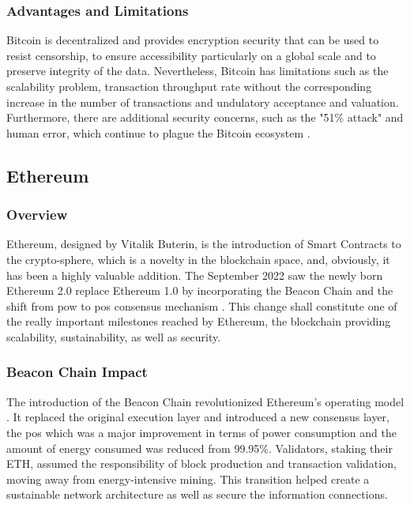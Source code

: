 \subsubsection{Advantages and Limitations}

Bitcoin is decentralized and provides encryption security that can be used to resist censorship, to ensure accessibility particularly on a global scale and to preserve integrity 
of the data. Nevertheless, Bitcoin has limitations such as the scalability problem, transaction throughput rate without the corresponding increase in the number of transactions 
and undulatory acceptance and valuation. Furthermore, there are additional security concerns, such as the "51\% attack" and human error, which continue to plague the Bitcoin 
ecosystem \cite{9129332}.

\subsection{Ethereum} \label{subsec:ethereum}

\subsubsection{Overview}

Ethereum, designed by Vitalik Buterin, is the introduction of Smart Contracts to the crypto-sphere, which is a novelty in the blockchain space, and, obviously, it has been 
a highly valuable addition. The September 2022 saw the newly born Ethereum 2.0 replace Ethereum 1.0 by incorporating the Beacon Chain and the shift from \gls{pow} 
to \gls{pos} consensus mechanism \cite{ethereummerge}. This change shall constitute one of the really important milestones reached by Ethereum, the blockchain providing 
scalability, sustainability, as well as security.

\subsubsection{Beacon Chain Impact}

The introduction of the Beacon Chain revolutionized Ethereum's operating model \cite{ethereummerge}. It replaced the original execution layer and introduced a new consensus layer, 
the \gls{pos} which was a major improvement in terms of power consumption and the amount of energy consumed was reduced from 99.95\%. Validators, staking their ETH, assumed the 
responsibility of block production and transaction validation, moving away from energy-intensive mining. This transition helped create a sustainable network 
architecture as well as secure the information connections.

